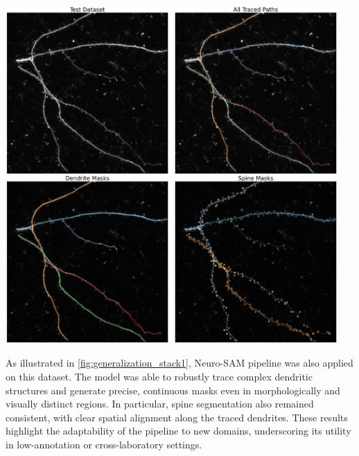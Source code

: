 \begin{center}
\includegraphics[width=0.95\textwidth]{figures/46_generalization_stack1.png}
\label{fig:generalization_stack1}
\end{center}

As illustrated in \autoref{fig:generalization_stack1}, Neuro-\gls{SAM} pipeline was also applied on this dataset. The model was able to robustly trace complex dendritic structures and generate precise, continuous masks even in morphologically and visually distinct regions. In particular, spine segmentation also remained consistent, with clear spatial alignment along the traced dendrites. These results highlight the adaptability of the pipeline to new domains, underscoring its utility in low-annotation or cross-laboratory settings.

